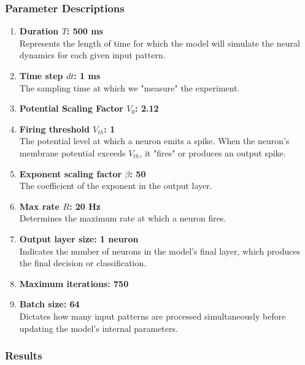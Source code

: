 \subsubsection{Parameter Descriptions}

\begin{enumerate}
    \item \textbf{Duration \( T \): 500 ms} \\
    Represents the length of time for which the model will simulate the neural dynamics for each given input pattern.
    
    \item \textbf{Time step \( dt \): 1 ms} \\
    The sampling time at which we "measure" the experiment.
    
    \item \textbf{Potential Scaling Factor \( V_0 \): 2.12} 
    
    \item \textbf{Firing threshold \( V_{th} \): 1} \\
    The potential level at which a neuron emits a spike. When the neuron's membrane potential exceeds $V_{th}$, it "fires" or produces an output spike.
    
    \item \textbf{Exponent scaling factor \( \beta \): 50} \\
    The coefficient of the exponent in the output layer.

    \item \textbf{Max rate \( R \): 20 Hz} \\
    Determines the maximum rate at which a neuron fires.
    
    \item \textbf{Output layer size: 1 neuron} \\
    Indicates the number of neurons in the model's final layer, which produces the final decision or classification.
    
    \item \textbf{Maximum iterations: 750} 

    \item \textbf{Batch size: 64} \\
    Dictates how many input patterns are processed simultaneously before updating the model's internal parameters. 

\end{enumerate}

\subsubsection{Results}

